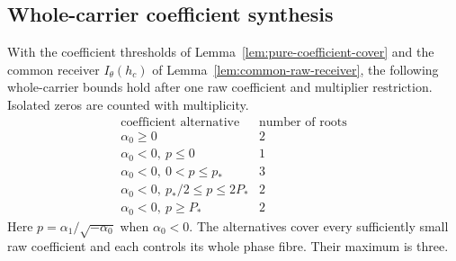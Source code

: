 \subsection{Whole-carrier coefficient synthesis}
\label{sharp:upper-section}
\label{sec:whole-carrier-applications}




\begin{proposition}\label{sharp:upper-coefficient-bounds}
With the coefficient thresholds of Lemma~\ref{lem:pure-coefficient-cover}
and the common receiver
\(I_\theta(h_c)\) of Lemma~\ref{lem:common-raw-receiver}, the following
whole-carrier bounds hold after one raw coefficient and multiplier
restriction. Isolated zeros are counted with multiplicity.
\[
\begin{array}{c|c}
 \text{coefficient alternative}&\text{number of roots}\\ \hline
 \alpha_0\ge0&2\\
 \alpha_0<0,\ p\le0&1\\
 \alpha_0<0,\ 0<p\le p_*&3\\
 \alpha_0<0,\ p_*/2\le p\le2P_*&2\\
 \alpha_0<0,\ p\ge P_*&2
\end{array}
\]
Here \(p=\alpha_1/\sqrt{-\alpha_0}\) when \(\alpha_0<0\).
The alternatives cover every sufficiently small raw coefficient and each
controls its whole phase fibre. Their maximum is three.
\end{proposition}
